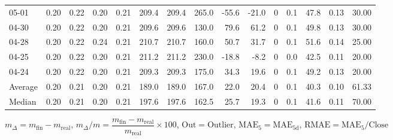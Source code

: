 \begin{threeparttable}
{\begin{tabular}{lrrrrrrrrrrrrrr}
  05-01 &          0.20 &          0.22 &          0.20 &        0.21 &               209.4 &              209.4 &               265.0 &      -55.6 &        -21.0 &              0 &                 0.1 &             47.8 &            0.13 &                  30.00 \\
  04-30 &          0.20 &          0.22 &          0.20 &        0.21 &               209.6 &              209.6 &               130.0 &       79.6 &         61.2 &              0 &                 0.1 &             49.8 &            0.13 &                  30.00 \\
  04-28 &          0.20 &          0.22 &          0.24 &        0.21 &               210.7 &              210.7 &               160.0 &       50.7 &         31.7 &              0 &                 0.1 &             51.6 &            0.14 &                  25.00 \\
  04-25 &          0.20 &          0.22 &          0.20 &        0.21 &               211.2 &              211.2 &               230.0 &      -18.8 &         -8.2 &              0 &                 0.0 &             42.5 &            0.11 &                  20.00 \\
  04-24 &          0.20 &          0.22 &          0.20 &        0.21 &               209.3 &              209.3 &               175.0 &       34.3 &         19.6 &              0 &                 0.1 &             49.2 &            0.13 &                  20.00 \\
Average &          0.20 &          0.21 &          0.20 &        0.21 &               189.0 &              189.0 &               167.0 &       22.0 &         20.4 &              0 &                 0.1 &             40.3 &            0.10 &                  61.33 \\
 Median &          0.20 &          0.21 &          0.20 &        0.21 &               197.6 &              197.6 &               162.5 &       25.7 &         19.3 &              0 &                 0.1 &             41.6 &            0.11 &                  70.00 \\
\bottomrule
\end{tabular}
}
\begin{tablenotes}\footnotesize
\item $m_\Delta=m_{\text{fin}}-m_{\text{real}}$,
$m_\Delta/m=\dfrac{m_{\text{fin}}-m_{\text{real}}}{m_{\text{real}}}\times100$,
$\mathrm{Out}=\text{Outlier}$,
$\mathrm{MAE}_5=\mathrm{MAE}_{5\text{d}}$,
$\mathrm{RMAE}=\mathrm{MAE}_5/\text{Close}$
\end{tablenotes}
\end{threeparttable}
\endgroup

